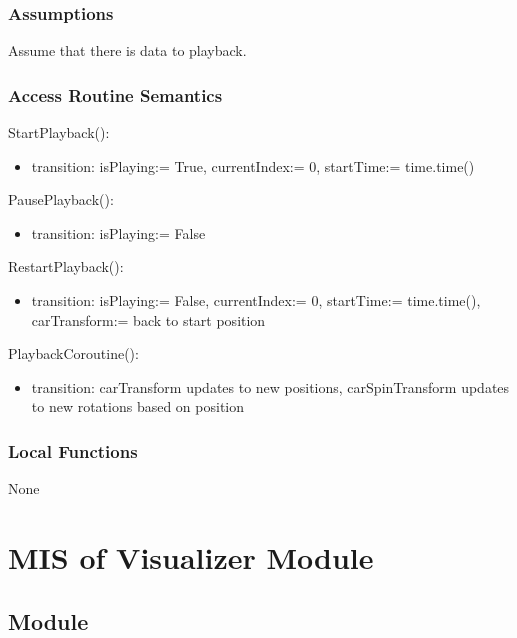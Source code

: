 \documentclass[12pt, titlepage]{article}
\begin{document}
\subsubsection{Assumptions}

Assume that there is data to playback.
\subsubsection{Access Routine Semantics}

\noindent StartPlayback():
\begin{itemize}
\item transition: isPlaying:= True, currentIndex:= 0, startTime:= time.time()
\end{itemize}

\noindent PausePlayback():
\begin{itemize}
\item transition: isPlaying:= False
\end{itemize}

\noindent RestartPlayback():
\begin{itemize}
\item transition: isPlaying:= False, currentIndex:= 0, startTime:= time.time(), carTransform:= back to start position
\end{itemize}

\noindent PlaybackCoroutine():
\begin{itemize}
\item transition: carTransform updates to new positions, carSpinTransform updates to new rotations based on position
\end{itemize}

\subsubsection{Local Functions}

None

\newpage

\section{MIS of Visualizer Module} \label{Module_visualizer} 



\subsection{Module}
\end{document}
